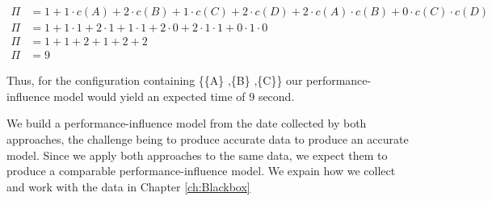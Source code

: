 \begin{align*}
    \Pi &= 1 + 1 \cdot c(A) + 2\cdot c(B) + 1\cdot c(C) + 2\cdot c(D) + 2 \cdot c(A)\cdot c(B) + 0\cdot c(C) \cdot c(D) \\
    \Pi &= 1 + 1 \cdot 1 + 2 \cdot 1 + 1 \cdot 1 + 2 \cdot 0 + 2 \cdot 1 \cdot 1 + 0 \cdot 1 \cdot 0 \\
    \Pi &= 1 + 1 + 2 + 1 + 2 + 2 \\
    \Pi &= 9
\end{align*}

Thus, for the configuration containing \{\{A\} ,\{B\} ,\{C\}\} our performance-influence model would yield an expected time of 9 second.

We build a performance-influence model from the date collected by both approaches, the challenge being to produce accurate data
to produce an accurate model. Since we apply both approaches to the same data, we expect them to produce a comparable performance-influence model.
We expain how we collect and work with the data in Chapter \ref{ch:Blackbox}%